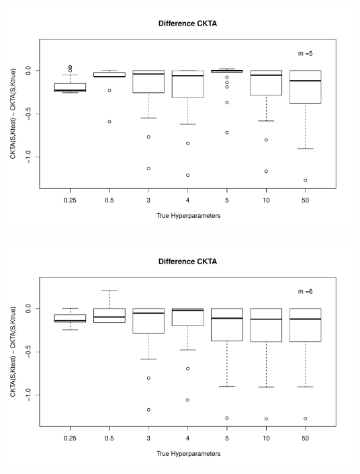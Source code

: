 \documentclass[11pt, a4paper]{article} %
\begin{document}
\begin{landscape}
\begin{figure}
\begin{subfigure}{\textwidth}
  \centering
  \includegraphics[width=.8\linewidth]{dif_ckta_m_5.pdf}
  \label{fig:sfig1}
\end{subfigure}%
\begin{subfigure}{\textwidth}
  \centering
  \includegraphics[width=.8\linewidth]{dif_ckta_m_6.pdf}
  \label{fig:sfig2}
\end{subfigure}\\


\end{figure}
\end{landscape}
\end{document}
